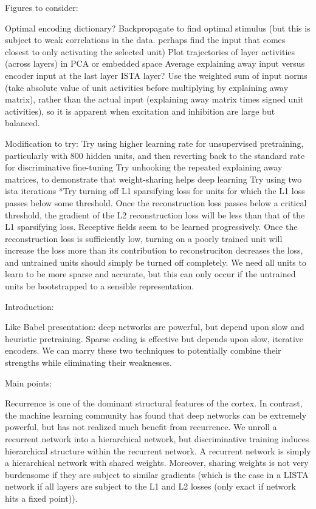 Figures to consider:

Optimal encoding dictionary?
Backpropagate to find optimal stimulus (but this is subject to weak correlations in the data.  perhaps find the input that comes closest to only activating the selected unit)
Plot trajectories of layer activities (across layers) in PCA or embedded space
Average explaining away input versus encoder input at the last layer ISTA layer?  Use the weighted sum of input norms (take absolute value of unit activities before multiplying by explaining away matrix), rather than the actual input (explaining away matrix times signed unit activities), so it is apparent when excitation and inhibition are large but balanced.

Modification to try:
Try using higher learning rate for unsupervised pretraining, particularly with 800 hidden units, and then reverting back to the standard rate for discriminative fine-tuning
Try unhooking the repeated explaining away matrices, to demonstrate that weight-sharing helps deep learning
Try using two ista iterations
*Try turning off L1 sparsifying loss for units for which the L1 loss passes below some threshold.  Once the reconstruction loss passes below a critical threshold, the gradient of the L2 reconstruction loss will be less than that of the L1 sparsifying loss.  Receptive fields seem to be learned progressively.  Once the reconstruction loss is sufficiently low, turning on a poorly trained unit will increase the loss more than its contribution to reconstruciton decreases the loss, and untrained units should simply be turned off completely.  We need all units to learn to be more sparse and accurate, but this can only occur if the untrained units be bootstrapped to a sensible representation.  


Introduction:

Like Babel presentation: deep networks are powerful, but depend upon slow and heuristic pretraining.  Sparse coding is effective but depends upon slow, iterative encoders.  We can marry these two techniques to potentially combine their strengths while eliminating their weaknesses.




Main points:

Recurrence is one of the dominant structural features of the cortex.  In contrast, the machine learning community has found that deep networks can be extremely powerful, but has not realized much benefit from recurrence.  We unroll a recurrent network into a hierarchical network, but discriminative training induces hierarchical structure within the recurrent network.  A recurrent network is simply a hierarchical network with shared weights.  Moreover, sharing weights is not very burdensome if they are subject to similar gradients (which is the case in a LISTA network if all layers are subject to the L1 and L2 losses (only exact if network hits a fixed point)).  

